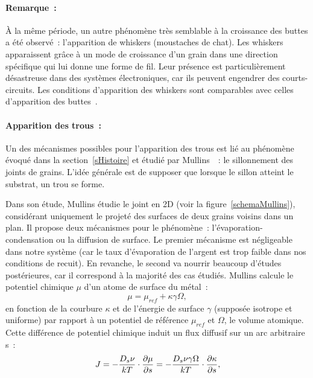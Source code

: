 \paragraph*{Remarque~:} À la même période, un autre phénomène très semblable à la croissance des buttes a été observé~: l'apparition de whiskers (moustaches de chat). Les whiskers apparaissent grâce à un mode de croissance d'un grain dans une direction spécifique qui lui donne une forme de fil. Leur présence est particulièrement désastreuse dans des systèmes électroniques, car ils peuvent engendrer des courts-circuits. Les conditions d'apparition des whiskers sont comparables avec celles d'apparition des buttes~\cite{rhead1963surface}.

\paragraph*{Apparition des trous~:} Un des mécanismes possibles pour l'apparition des trous est lié au phénomène évoqué dans la section~\ref{sHistoire} et étudié par Mullins~\cite{mullins1957theory}~: le sillonnement des joints de grains. L'idée générale est de supposer que lorsque le sillon atteint le substrat, un trou se forme.\par 
Dans son étude, Mullins étudie le joint en 2D (voir la figure~\ref{schemaMullins}), considérant uniquement le projeté des surfaces de deux grains voisins dans un plan. Il propose deux mécanismes pour le phénomène~: l'évaporation-condensation ou la diffusion de surface. Le premier mécanisme est négligeable dans notre système (car le taux d'évaporation de l'argent est trop faible dans nos conditions de recuit). En revanche, le second va nourrir beaucoup d'études postérieures, car il correspond à la majorité des cas étudiés. Mullins calcule le potentiel chimique $\mu$ d'un atome de surface du métal~: 
\begin{equation}
\mu = \mu_{ref} + \kappa \gamma \Omega,
\end{equation}
en fonction de la courbure $\kappa$ et de l'énergie de surface $\gamma$ (supposée isotrope et uniforme) par rapport à un potentiel de référence $\mu_{ref}$ et $\Omega$, le volume atomique. Cette différence de potentiel chimique induit un flux diffusif sur un arc arbitraire s~:
\begin{equation}
J = -\dfrac{D_s\nu}{kT}\cdot\dfrac{\partial\mu}{\partial s}\newline
 = -\dfrac{D_s\nu\gamma\Omega}{kT}\cdot\dfrac{\partial\kappa}{\partial s},
\label{eDiffFlux}
\end{equation}
